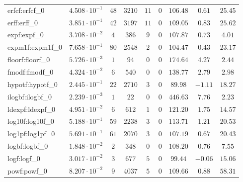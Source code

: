 \begin{tabular}{|l|c|c|c|c|c|c|c|c|}
erfcf:erfcf\_0               & $ 4.508 \cdot 10^{-1} $ & $ 48     $ & $ 3210  $ & $ 11  $ & $ 0   $ & $ 106.48      $ & $ 0.61    $ & $ 25.45   $ \\
erff:erff\_0                 & $ 3.851 \cdot 10^{-1} $ & $ 42     $ & $ 3197  $ & $ 11  $ & $ 0   $ & $ 109.05      $ & $ 0.83    $ & $ 25.62   $ \\
expf:expf\_0                 & $ 3.708 \cdot 10^{-2} $ & $ 4      $ & $ 386   $ & $ 9   $ & $ 0   $ & $ 107.87      $ & $ 0.73    $ & $ 4.01    $ \\
expm1f:expm1f\_0             & $ 7.658 \cdot 10^{-1} $ & $ 80     $ & $ 2548  $ & $ 2   $ & $ 0   $ & $ 104.47      $ & $ 0.43    $ & $ 23.17   $ \\
floorf:floorf\_0             & $ 5.726 \cdot 10^{-3} $ & $ 1      $ & $ 94    $ & $ 0   $ & $ 0   $ & $ 174.64      $ & $ 4.27    $ & $ 2.44    $ \\
fmodf:fmodf\_0               & $ 4.324 \cdot 10^{-2} $ & $ 6      $ & $ 540   $ & $ 0   $ & $ 0   $ & $ 138.77      $ & $ 2.79    $ & $ 2.98    $ \\
hypotf:hypotf\_0             & $ 2.445 \cdot 10^{-1} $ & $ 22     $ & $ 2710  $ & $ 3   $ & $ 0   $ & $ 89.98       $ & $ -1.11   $ & $ 18.27   $ \\
ilogbf:ilogbf\_0             & $ 2.239 \cdot 10^{-3} $ & $ 1      $ & $ 22    $ & $ 0   $ & $ 0   $ & $ 446.63      $ & $ 7.76    $ & $ 2.23    $ \\
ldexpf:ldexpf\_0             & $ 4.951 \cdot 10^{-2} $ & $ 6      $ & $ 612   $ & $ 1   $ & $ 0   $ & $ 121.20      $ & $ 1.75    $ & $ 14.57   $ \\
log10f:log10f\_0             & $ 5.188 \cdot 10^{-1} $ & $ 59     $ & $ 2238  $ & $ 3   $ & $ 0   $ & $ 113.71      $ & $ 1.21    $ & $ 20.53   $ \\
log1pf:log1pf\_0             & $ 5.691 \cdot 10^{-1} $ & $ 61     $ & $ 2070  $ & $ 3   $ & $ 0   $ & $ 107.19      $ & $ 0.67    $ & $ 20.43   $ \\
logbf:logbf\_0               & $ 1.848 \cdot 10^{-2} $ & $ 2      $ & $ 348   $ & $ 0   $ & $ 0   $ & $ 108.20      $ & $ 0.76    $ & $ 7.55    $ \\
logf:logf\_0                 & $ 3.017 \cdot 10^{-2} $ & $ 3      $ & $ 677   $ & $ 5   $ & $ 0   $ & $ 99.44       $ & $ -0.06   $ & $ 15.06   $ \\
powf:powf\_0                 & $ 8.207 \cdot 10^{-2} $ & $ 9      $ & $ 4037  $ & $ 5   $ & $ 0   $ & $ 109.66      $ & $ 0.88    $ & $ 58.31   $ \\

\end{tabular}
